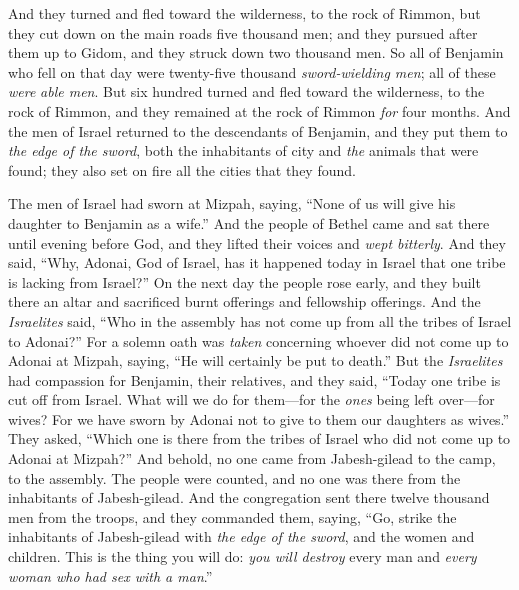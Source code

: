 \begin{biblechapter}
\verse And they turned and fled toward the wilderness, to the rock of Rimmon, but they cut down on the main roads five thousand men; and they pursued after them up to Gidom, and they struck down two thousand men.
\verse So all of Benjamin who fell on that day were twenty-five thousand \textit{sword-wielding men}; all of these \textit{were} \textit{able men}.
\verse But six hundred turned and fled toward the wilderness, to the rock of Rimmon, and they remained at the rock of Rimmon \textit{for} four months.
\verse And the men of Israel returned to the descendants of Benjamin, and they put them to \textit{the edge of the sword}, both the inhabitants of city and \textit{the} animals that were found; they also set on fire all the cities that they found.
\end{biblechapter}

\begin{biblechapter} %
 The men of Israel had sworn at Mizpah, saying, “None of us will give his daughter to Benjamin as a wife.”
\verse And the people of Bethel came and sat there until evening before God, and they lifted their voices and \textit{wept bitterly}.
\verse And they said, “Why, Adonai, God of Israel, has it happened today in Israel that one tribe is lacking from Israel?”
\verse On the next day the people rose early, and they built there an altar and sacrificed burnt offerings and fellowship offerings.
\verse And the \textit{Israelites} said, “Who in the assembly has not come up from all the tribes of Israel to Adonai?” For a solemn oath was \textit{taken} concerning whoever did not come up to Adonai at Mizpah, saying, “He will certainly be put to death.”
\verse But the \textit{Israelites} had compassion for Benjamin, their relatives, and they said, “Today one tribe is cut off from Israel.
\verse What will we do for them—for the \textit{ones} being left over—for wives? For we have sworn by Adonai not to give to them our daughters as wives.”
\verse They asked, “Which one is there from the tribes of Israel who did not come up to Adonai at Mizpah?” And behold, no one came from Jabesh-gilead to the camp, to the assembly.
\verse The people were counted, and no one was there from the inhabitants of Jabesh-gilead.
\verse And the congregation sent there twelve thousand men from the troops, and they commanded them, saying, “Go, strike the inhabitants of Jabesh-gilead with \textit{the edge of the sword}, and the women and children.
\verse This is the thing you will do: \textit{you will destroy} every man and \textit{every woman who had sex with a man}.”

\end{biblechapter}
